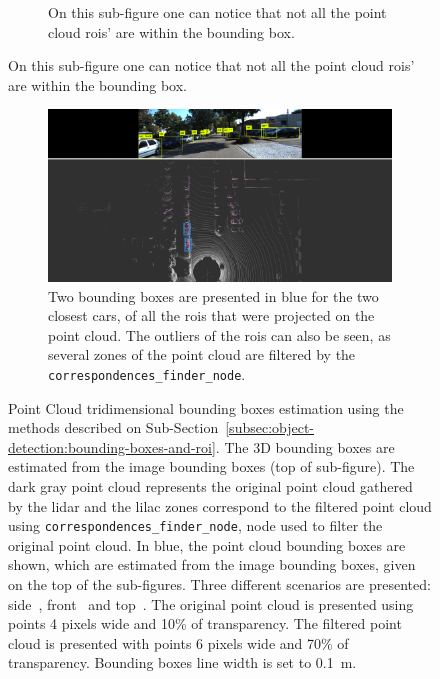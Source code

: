 \begin{figure}[H]
\begin{subfigure}[c]{0.8\textwidth}
		\caption{On this sub-figure one can notice that not all the point cloud \acsp{roi}' are within the bounding box.}
		\label{fig:bboxes-3d-kitti-front}
	\end{subfigure}
\end{figure}
\begin{figure}[!ht]\ContinuedFloat
	\centering
	\begin{subfigure}[c]{0.8\textwidth}
		\centering
		\includegraphics[width=\textwidth]{img/image-object-to-point-cloud/bboxes-top-view.png}
		\caption{Two bounding boxes are presented in blue for the two closest cars, of all the \acsp{roi} that were projected on the point cloud. The outliers of the \acsp{roi} can also be seen, as several zones of the point cloud are filtered by the \texttt{correspondences\_finder\_node}.}
		\label{fig:bboxes-3d-kitti-top}
	\end{subfigure}
	\caption[Comparison between the estimated tridimensional bounding boxes' dimensions and position and the point cloud data, object clusters and \acs{roi}.]{Point Cloud tridimensional bounding boxes estimation using the methods described on Sub-Section~\ref{subsec:object-detection:bounding-boxes-and-roi}. The 3D bounding boxes are estimated from the image bounding boxes (top of sub-figure). The dark gray point cloud represents the original point cloud gathered by the \ac{lidar} and the lilac zones correspond to the filtered point cloud using \texttt{correspondences\_finder\_node}, node used to filter the original point cloud. In blue, the point cloud bounding boxes are shown, which are estimated from the image bounding boxes, given on the top of the sub-figures. Three different scenarios are presented: side~, front~ and top~. The original point cloud is presented using points 4 pixels wide and 10\% of transparency. The filtered point cloud is presented with points 6 pixels wide and 70\% of transparency. Bounding boxes line width is set to \SI{0.1}{\meter}.} 
	\label{fig:bboxes-3d-kitti}
\end{figure}


